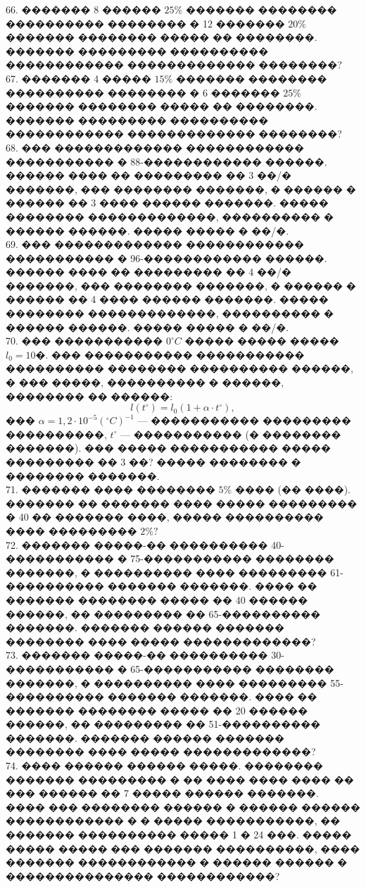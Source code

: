 \documentclass[12pt]{article}
\begin{document}
66. ������� 8 ������ $25\%$ ������� �������� ���������� �������� � 12 ������� $20\%$ ������� �������� ����� �� ��������. ������� ��������� ���������� ������������ ������������� ��������?\\
67. ������� 4 ����� $15\%$ ������� �������� ���������� �������� � 6 ������� $25\%$ ������� �������� ����� �� ��������. ������� ��������� ���������� ������������ ������������� ��������?\\
68. ��� ������������� ������������ ����������� � 88-������������ ������. ������ ���� �� ��������� �� 3 ��/� �������, ��� �������� �������, � ������ � ������ �� 3 ���� ������ �������. ����� �������� �������������, ���������� � ������ ������. ����� ����� � ��/�.\\
69. ��� ������������� ������������ ����������� � 96-������������ ������. ������ ���� �� ��������� �� 4 ��/� �������, ��� �������� �������, � ������ � ������ �� 4 ���� ������ �������. ����� �������� �������������, ���������� � ������ ������. ����� ����� � ��/�.\\
70. ��� ����������� $0^\circ C$ ����� ����� ����� $l_0=10$�. ��� ����������� ����������� ���������� �������� ���������� ������, � ��� �����, ���������� � ������, �������� �� ������:
$$l(t^\circ)=l_0(1+\alpha\cdot t^\circ),$$
��� $\alpha=1,2\cdot10^{-5}(^\circ C)^{-1}$ --- ����������� ��������� ����������, $t^\circ$ --- ����������� (� �������� �������). ��� ����� ����������� ����� ��������� �� 3 ��? ����� �������� � �������� �������.\\
71. ������� ���� �������� $5\%$ ���� (�� ����). ������� �� ������� ���� ����� ��������� � 40 �� ������� ����, ����� ���������� ���� ��������� $2\%?$\\
72. ������� �����-�� ���������� 40-����������� � 75-����������� �������� �������, � ���������� ���� ��������� 61-���������� ������� �������. ���� �� ������� �������� ����� �� 40 ������ ������, �� ��������� �� 65-���������� �������. ������� ������ ������� �������� ���� ����� �������������?\\
73. ������� �����-�� ���������� 30-����������� � 65-����������� �������� �������, � ���������� ���� ��������� 55-���������� ������� �������. ���� �� ������� �������� ����� �� 20 ������ ������, �� ��������� �� 51-���������� �������. ������� ������ ������� �������� ���� ����� �������������?\\
74. ���� ������ ������ �����. �������� ������� ��������� � �� ���� ���� ���� �� ��� ������ �� 7 ����� ������ �������. ���� ��� �������� ������ � ������ ������ ������������ � � ����� �����������, �� ������� ���������� ����� 1 � 24 ���. ����� ����� ����� ��� ������� ����������, ���� ������� ������������ � ������ ������ � ��������������� ������������?\\
\end{document}
